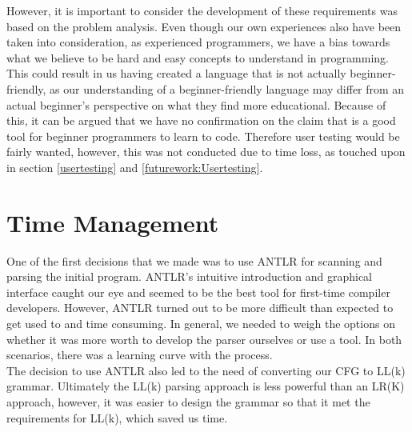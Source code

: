 However, it is important to consider the development of these requirements was based on the problem analysis. Even though our own experiences also have been taken into consideration, as experienced programmers, we have a bias towards what we believe to be hard and easy concepts to understand in programming. This could result in us having created a language that is not actually beginner-friendly, as our understanding of a beginner-friendly language may differ from an actual beginner's perspective on what they find more educational. Because of this, it can be argued that we have no confirmation on the claim that \lang is a good tool for beginner programmers to learn to code. Therefore user testing would be fairly wanted, however, this was not conducted due to time loss, as touched upon in section \ref{usertesting} and \ref{futurework:Usertesting}.

\section{Time Management} \label{discussion:Time}
One of the first decisions that we made was to use ANTLR for scanning and parsing the initial program. ANTLR's intuitive introduction and graphical interface caught our eye and seemed to be the best tool for first-time compiler developers. However, ANTLR turned out to be more difficult than expected to get used to and time consuming. In general, we needed to weigh the options on whether it was more worth to develop the parser ourselves or use a tool. In both scenarios, there was a learning curve with the process. \\

The decision to use ANTLR also led to the need of converting our CFG to LL(k) grammar. Ultimately the LL(k) parsing approach is less powerful than an LR(K) approach, however, it was easier to design the grammar so that it met the requirements for LL(k), which saved us time. \\

